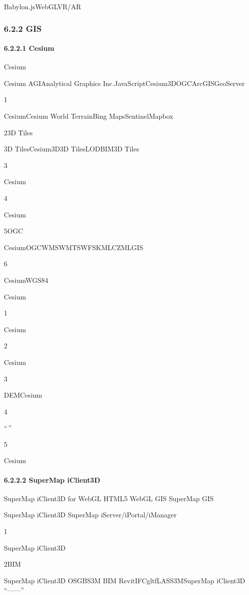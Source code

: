Babylon.jsWebGLVR/AR

\hypertarget{gis-1}{%
\subsubsection{6.2.2 GIS}\label{gis-1}}

\hypertarget{cesium}{%
\paragraph{6.2.2.1 Cesium}\label{cesium}}

Cesium

Cesium AGIAnalytical Graphics Inc.JavaScriptCesium3DOGCArcGISGeoServer

1

CesiumCesium World TerrainBing MapsSentinelMapbox

23D Tiles

3D TilesCesium3D3D TilesLODBIM3D Tiles

3

Cesium

4

Cesium

5OGC

CesiumOGCWMSWMTSWFSKMLCZMLGIS

6

CesiumWGS84

Cesium

1

Cesium

2

Cesium

3

DEMCesium

4

``\,''

5

Cesium

\hypertarget{supermap-iclient3d}{%
\paragraph{6.2.2.2 SuperMap iClient3D}\label{supermap-iclient3d}}

SuperMap iClient3D for WebGL HTML5 WebGL GIS SuperMap GIS

SuperMap iClient3D SuperMap iServer/iPortal/iManager

1

SuperMap iClient3D

2BIM

SuperMap iClient3D OSGBS3M BIM RevitIFCgltfLASS3MSuperMap iClient3D
``------''

